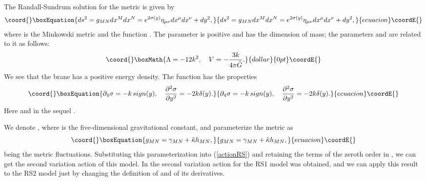 \documentclass[a4paper,12pt]{article}
\begin{document}
The Randall-Sundrum solution for the  metric is {given by}
\begin{equation}\coord{}\boxEquation{\label{metricrs}
ds^2=  g_{MN} d{x}^M d{x}^N = e^{2\sigma(y)} \eta_{\mu\nu}
{dx^\mu dx^\nu} +
  dy^2,
}{ds^2=  g_{MN} d{x}^M d{x}^N = e^{2\sigma(y)} \eta_{\mu\nu}
{dx^\mu dx^\nu} +
  dy^2,
}{ecuacion}\coordE{}\end{equation}
where \myHighlight{$\eta_{\mu\nu}$}\coordHE{} is the Minkowski metric and {the function}
\coordHE{}. The parameter  \coordHE{} is positive and has the
dimension of mass; the parameters \myHighlight{$\Lambda$}\coordHE{} and \coordHE{} are {related
to it as follows:} $$\coord{}\boxMath{ \Lambda = -12 k^2, \quad V = -\frac{3k}{4\pi
\hat G}. }{dollar}{0pt}\coordE{}$$ We see that the brane has a positive energy density.
The function \myHighlight{$\sigma$}\coordHE{} has the properties
\begin{equation}\coord{}\boxEquation{\label{sigma}
  \partial_4 \sigma = -k\, sign(y), \quad \frac{\partial^2 \sigma}{\partial
  {y}^2} =-2k\delta(y).
}{\partial_4 \sigma = -k\, sign(y), \quad \frac{\partial^2 \sigma}{\partial
  {y}^2} =-2k\delta(y).
}{ecuacion}\coordE{}\end{equation}
Here and in the sequel \coordHE{}.

We denote \coordHE{}, where \coordHE{} is the
five-dimensional gravitational constant, and parameterize the metric
\coordHE{} as
\begin{equation}\coord{}\boxEquation{\label{metricpar}
  g_{MN} = \gamma_{MN} + \hat \kappa h_{MN},
}{g_{MN} = \gamma_{MN} + \hat \kappa h_{MN},
}{ecuacion}\coordE{}\end{equation}
\coordHE{} being the metric fluctuations. Substituting this
parameterization into (\ref{actionRS}) and retaining the terms of
the zeroth order in \myHighlight{$\hat \kappa$}\coordHE{}, we can get the second variation
action of this model. In \cite{BKSV} the second
variation action for the  RS1 model was obtained, and we can apply this
result to the RS2 model just  by changing the definition of \coordHE{} and
of its derivatives.
\end{document}
